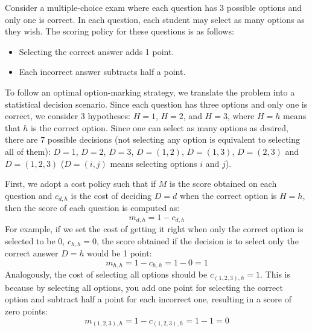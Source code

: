 Consider a multiple-choice exam where each question has 3 possible options and only one is correct. In each question, each student may select as many options as they wish. The scoring policy for these questions is as follows:
\begin{itemize}
\item Selecting the correct answer adds 1 point.
\item Each incorrect answer subtracts half a point.
\end{itemize}

To follow an optimal option-marking strategy, we translate the problem into a statistical decision scenario. Since each question has three options and only one is correct, we consider 3 hypotheses: $H=1$, $H=2$, and $H=3$, where $H=h$ means that $h$ is the correct option. Since one can select as many options as desired, there are 7 possible decisions (not selecting any option is equivalent to selecting all of them): $D=1$, $D=2$, $D=3$, $D=(1,2)$, $D=(1,3)$, $D=(2,3)$ and $D=(1,2,3)$ ($D=(i,j)$ means selecting options $i$ and $j$).

First, we adopt a cost policy such that if $M$ is the score obtained on each question and $c_{d,h}$ is the cost of deciding $D=d$ when the correct option is $H=h$, then the score of each question is computed as:
$$
m_{d,h} = 1-c_{d,h}
$$
For example, if we set the cost of getting it right when only the correct option is selected to be 0, $c_{h,h}=0$, the score obtained if the decision is to select only the correct answer $D=h$ would be 1 point:
$$
m_{h,h}=1-c_{h,h} = 1-0=1
$$
Analogously, the cost of selecting all options should be $c_{(1,2,3),h}=1$. This is because by selecting all options, you add one point for selecting the correct option and subtract half a point for each incorrect one, resulting in a score of zero points:
$$
m_{(1,2,3),h} = 1-c_{(1,2,3),h} = 1-1=0
$$

